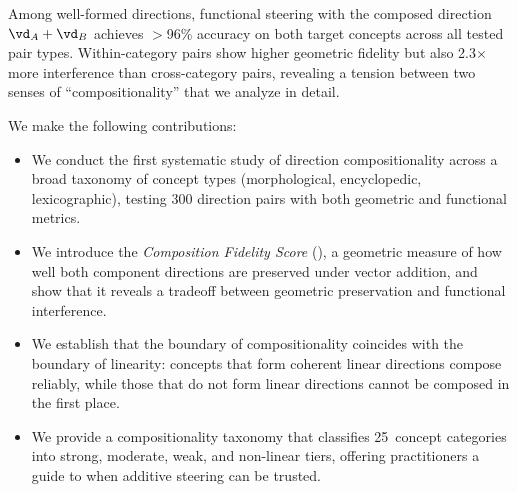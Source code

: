 Among well-formed directions, functional steering with the composed direction $\vd_A + \vd_B$ achieves $>$96\% accuracy on both target concepts across all tested pair types.
Within-category pairs show higher geometric fidelity but also 2.3$\times$ more interference than cross-category pairs, revealing a tension between two senses of ``compositionality'' that we analyze in detail.

We make the following contributions:
\begin{itemize}[leftmargin=*,itemsep=0pt,topsep=0pt]
    \item We conduct the first systematic study of direction compositionality across a broad taxonomy of concept types (morphological, encyclopedic, lexicographic), testing 300 direction pairs with both geometric and functional metrics.
    \item We introduce the \emph{Composition Fidelity Score} (\cfs), a geometric measure of how well both component directions are preserved under vector addition, and show that it reveals a tradeoff between geometric preservation and functional interference.
    \item We establish that the boundary of compositionality coincides with the boundary of linearity: concepts that form coherent linear directions compose reliably, while those that do not form linear directions cannot be composed in the first place.
    \item We provide a compositionality taxonomy that classifies 25~concept categories into strong, moderate, weak, and non-linear tiers, offering practitioners a guide to when additive steering can be trusted.
\end{itemize}
